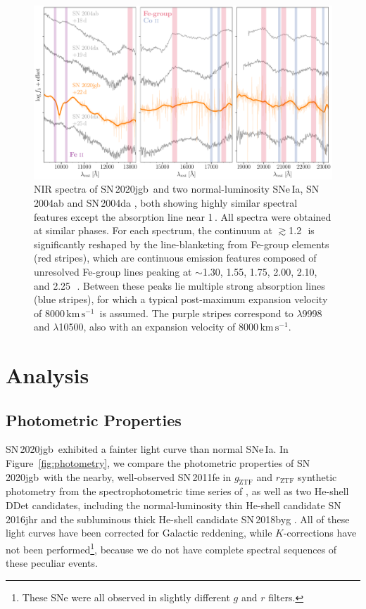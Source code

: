 \documentclass[twocolumn]{aastex631}
\newcommand{\sn}{SN\,2020jgb}
\newcommand{\kms}{$\mathrm{km}\,\mathrm{s}^{-1}$}
\begin{document}
\begin{figure}
    \centering
    \includegraphics[width=\textwidth]{NIR_spec.pdf}
    \caption{NIR spectra of \sn\ and two normal-luminosity SNe\,Ia, SN\,2004ab and SN\,2004da \citep{Marion2009_NIR}, both showing highly similar spectral features except the absorption line near 1\,\micron. All spectra were obtained at similar phases. For each spectrum, the continuum at $\gtrsim$1.2\,\micron\ is significantly reshaped by the line-blanketing from Fe-group elements (red stripes), which are continuous emission features composed of unresolved Fe-group lines peaking at $\sim$1.30, 1.55, 1.75, 2.00, 2.10, and 2.25\,\micron\ \citep{Marion2009_NIR}. Between these peaks lie multiple strong  absorption lines (blue stripes), for which a typical post-maximum expansion velocity of 8000\,\kms\ is assumed. The purple stripes correspond to  $\lambda$9998 and  $\lambda$10500, also with an expansion velocity of 8000\,\kms.}
    \label{fig:NIR_spec}
\end{figure}

\section{Analysis} \label{sec:analysis}
\subsection{Photometric Properties} \label{sec:phot_analysis}
\sn\ exhibited a fainter light curve than normal SNe\,Ia. In Figure~\ref{fig:photometry}, we compare the photometric properties of \sn\ with the nearby, well-observed SN\,2011fe in $g_\mathrm{ZTF}$ and $r_\mathrm{ZTF}$ synthetic photometry from the spectrophotometric time series of \citet{Pereira_2013}, as well as two He-shell DDet candidates, including the normal-luminosity thin He-shell candidate SN\,2016jhr \citep{jiang_16jhr_2017} and the subluminous thick He-shell candidate SN\,2018byg \citep{de_18byg_2019}. All of these light curves have been corrected for Galactic reddening, while $K$-corrections have not been performed\footnote{These SNe were all observed in slightly different $g$ and $r$ filters.}, because we do not have complete spectral sequences of these peculiar events.
\end{document}
